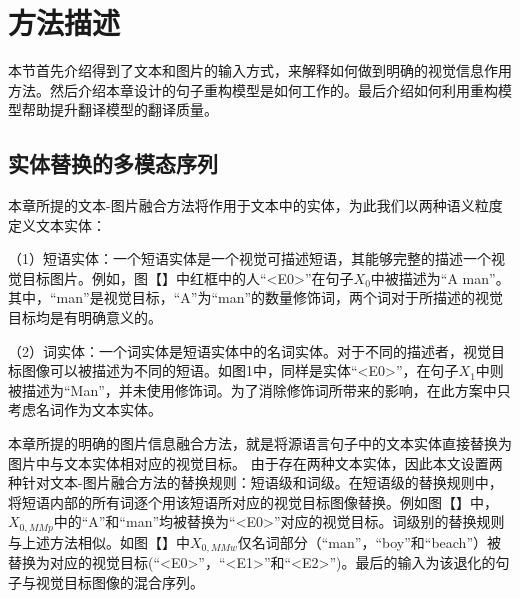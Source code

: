 \section{方法描述}

本节首先介绍得到了文本和图片的输入方式，来解释如何做到明确的视觉信息作用方法。然后介绍本章设计的句子重构模型是如何工作的。最后介绍如何利用重构模型帮助提升翻译模型的翻译质量。

\subsection{实体替换的多模态序列}
本章所提的文本-图片融合方法将作用于文本中的实体，为此我们以两种语义粒度定义文本实体：

（1）{\sffamily 短语实体：}一个短语实体是一个视觉可描述短语，其能够完整的描述一个视觉目标图片。例如，图【】中红框中的人“<E0>”在句子$X_0$中被描述为“A man”。其中，“man”是视觉目标，“A”为“man”的数量修饰词，两个词对于所描述的视觉目标均是有明确意义的。

（2）{\sffamily 词实体：}一个词实体是短语实体中的名词实体。对于不同的描述者，视觉目标图像可以被描述为不同的短语。如图1中，同样是实体“<E0>”，在句子$X_1$中则被描述为“Man”，并未使用修饰词。为了消除修饰词所带来的影响，在此方案中只考虑名词作为文本实体。

本章所提的明确的图片信息融合方法，就是将源语言句子中的文本实体直接替换为图片中与文本实体相对应的视觉目标。
由于存在两种文本实体，因此本文设置两种针对文本-图片融合方法的替换规则：短语级和词级。在短语级的替换规则中，将短语内部的所有词逐个用该短语所对应的视觉目标图像替换。例如图【】中，$X_{0,MMp}$中的“A”和“man”均被替换为“<E0>”对应的视觉目标。词级别的替换规则与上述方法相似。如图【】中$X_{0,MMw}$仅名词部分（“man”，“boy”和“beach”）被替换为对应的视觉目标(“<E0>”，“<E1>”和“<E2>”)。最后的输入为该退化的句子与视觉目标图像的混合序列。


